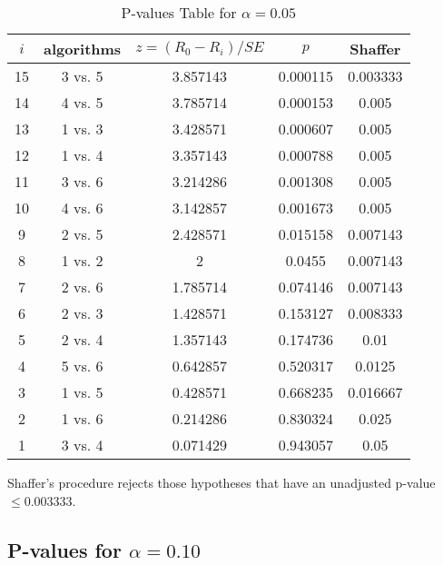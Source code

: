 \documentclass[a4paper,10pt]{article}
\begin{document}
\begin{landscape}
\begin{table}[!htp]
\centering\scriptsize
\begin{tabular}{ccccc}
$i$&algorithms&$z=(R_0 - R_i)/SE$&$p$&Shaffer\\
\hline15&3 vs. 5&3.857143&0.000115&0.003333\\
14&4 vs. 5&3.785714&0.000153&0.005\\
13&1 vs. 3&3.428571&0.000607&0.005\\
12&1 vs. 4&3.357143&0.000788&0.005\\
11&3 vs. 6&3.214286&0.001308&0.005\\
10&4 vs. 6&3.142857&0.001673&0.005\\
9&2 vs. 5&2.428571&0.015158&0.007143\\
8&1 vs. 2&2&0.0455&0.007143\\
7&2 vs. 6&1.785714&0.074146&0.007143\\
6&2 vs. 3&1.428571&0.153127&0.008333\\
5&2 vs. 4&1.357143&0.174736&0.01\\
4&5 vs. 6&0.642857&0.520317&0.0125\\
3&1 vs. 5&0.428571&0.668235&0.016667\\
2&1 vs. 6&0.214286&0.830324&0.025\\
1&3 vs. 4&0.071429&0.943057&0.05\\
\hline
\end{tabular}
\caption{P-values Table for $\alpha=0.05$}
\end{table}Shaffer's procedure rejects those hypotheses that have an unadjusted p-value $\le0.003333$.

\pagebreak

\subsection{P-values for $\alpha=0.10$}


\end{landscape}
\end{document}
